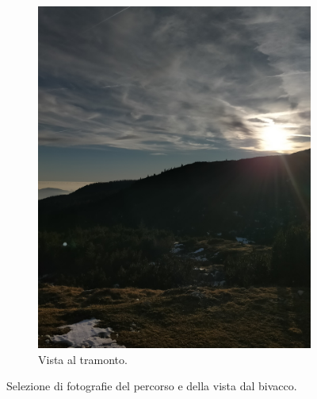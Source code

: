 \documentclass{article}
\begin{document}
\begin{figure}[H]
\begin{subfigure}[b]{0.45\textwidth}
        \includegraphics[width=\textwidth]{images/foto_tramonto.jpg}
        \caption{Vista al tramonto.}
    \end{subfigure}
    \hfill

    \caption{Selezione di fotografie del percorso e della vista dal bivacco.}
\end{figure}
\end{document}
